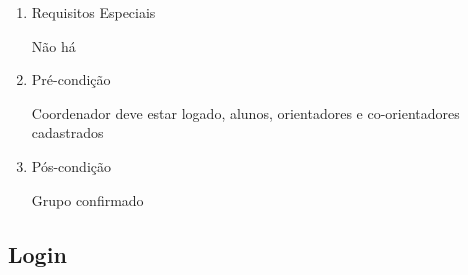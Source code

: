 \begin{enumerate}
\begin{enumerate}
    \item Requisitos Especiais


Não há


    \item Pré-condição


Coordenador deve estar logado, alunos, orientadores e co-orientadores cadastrados


    \item Pós-condição

    Grupo confirmado
\end{enumerate}
\end{enumerate}

\subsection{Login}


